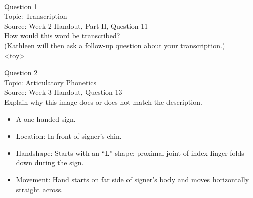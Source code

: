 \documentclass[12pt]{article}
\begin{document}
\newpage

\begin{center}
\textbf{{\color{red}{\HUGE END OF EXAM}}}\\

\end{center}
\newpage

\begin{center}
\textbf{{\color{blue}{\HUGE START OF EXAM\\}}}

\textbf{{\color{blue}{\HUGE Student ID: 94675\\}}}

\textbf{{\color{blue}{\HUGE \\}}}

\end{center}
\newpage

{\large Question 1}\\

Topic: Transcription\\
Source: Week 2 Handout, Part II, Question 11\\

How would this word be transcribed?\\ (Kathleen will then ask a follow-up question about your transcription.)\\

<toy>


\newpage

{\large Question 2}\\

Topic: Articulatory Phonetics\\
Source: Week 3 Handout, Question 13\\

Explain why this image does or does not match the description.\\

\begin{itemize} \item A one-handed sign. \item Location: In front of signer’s chin. \item Handshape: Starts with an “L” shape; proximal joint of index finger folds down during the sign. \item Movement: Hand starts on far side of signer’s body and moves horizontally straight across. \end{itemize}
\end{document}
